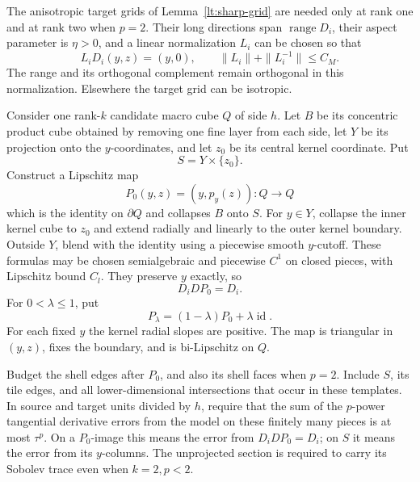 \documentclass[11pt]{article}
\numberwithin{equation}{section}
\theoremstyle{definition}
\theoremstyle{remark}
\begin{document}
The anisotropic target grids of Lemma~\ref{lt:sharp-grid} are needed
only at rank one and at rank two when $p=2$.  Their long directions
span $\operatorname{range}D_i$, their aspect parameter is $\eta>0$,
and a linear normalization $L_i$ can be chosen so that
\begin{equation}\label{la:normalization}
 L_iD_i(y,z)=(y,0),\qquad
 \|L_i\|+\|L_i^{-1}\|\le C_M.
\end{equation}
The range and its orthogonal complement remain orthogonal in this
normalization.  Elsewhere the target grid can be isotropic.

Consider one rank-$k$ candidate macro cube $Q$ of side $h$.  Let $B$
be its concentric product cube obtained by removing one fine layer
from each side, let $Y$ be its projection onto the $y$-coordinates,
and let $z_0$ be its central kernel coordinate.  Put
\[
 S=Y\times\{z_0\}.
\]
Construct a Lipschitz map
\begin{equation}\label{la:flat-collapse}
 P_0(y,z)=(y,p_y(z)):Q\longrightarrow Q
\end{equation}
which is the identity on $\partial Q$ and collapses $B$ onto $S$.
For $y\in Y$, collapse the inner kernel cube to $z_0$ and extend
radially and linearly to the outer kernel boundary.  Outside $Y$,
blend with the identity using a piecewise smooth $y$-cutoff.  These
formulas may be chosen semialgebraic and piecewise $C^1$ on closed
pieces, with Lipschitz bound $C_l$.  They preserve $y$ exactly, so
\begin{equation}\label{la:collapse-model-identity}
 D_iDP_0=D_i.
\end{equation}
For $0<\lambda\le1$, put
\begin{equation}\label{la:positive-collapse}
 P_\lambda=(1-\lambda)P_0+\lambda\operatorname{id}.
\end{equation}
For each fixed $y$ the kernel radial slopes are positive.  The map is
triangular in $(y,z)$, fixes the boundary, and is bi-Lipschitz on $Q$.

Budget the shell edges after $P_0$, and also its shell faces when
$p=2$.  Include $S$, its tile edges, and all lower-dimensional
intersections that occur in these templates.  In source and target
units divided by $h$, require that the sum of the $p$-power
tangential derivative errors from the model on these finitely many
pieces is at most $\tau^p$.  On a $P_0$-image this means the error
from $D_iDP_0=D_i$; on $S$ it means the error from its $y$-columns.
The unprojected section is required to carry its Sobolev trace even
when $k=2,p<2$.
\end{document}

